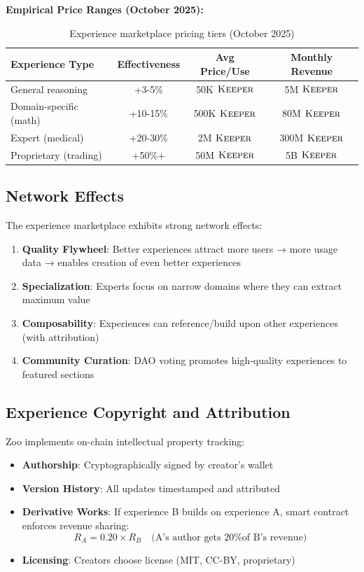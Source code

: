 \textbf{Empirical Price Ranges (October 2025):}

\begin{table}[h]
\centering
\begin{tabular}{lccc}
\toprule
\textbf{Experience Type} & \textbf{Effectiveness} & \textbf{Avg Price/Use} & \textbf{Monthly Revenue} \\
\midrule
General reasoning & +3-5\% & 50K $\textsc{Keeper}$ & 5M $\textsc{Keeper}$ \\
Domain-specific (math) & +10-15\% & 500K $\textsc{Keeper}$ & 80M $\textsc{Keeper}$ \\
Expert (medical) & +20-30\% & 2M $\textsc{Keeper}$ & 300M $\textsc{Keeper}$ \\
Proprietary (trading) & +50\%+ & 50M $\textsc{Keeper}$ & 5B $\textsc{Keeper}$ \\
\bottomrule
\end{tabular}
\caption{Experience marketplace pricing tiers (October 2025)}
\label{tab:experience_pricing}
\end{table}

\subsection{Network Effects}

The experience marketplace exhibits strong network effects:

\begin{enumerate}
\item \textbf{Quality Flywheel}: Better experiences attract more users → more usage data → enables creation of even better experiences
\item \textbf{Specialization}: Experts focus on narrow domains where they can extract maximum value
\item \textbf{Composability}: Experiences can reference/build upon other experiences (with attribution)
\item \textbf{Community Curation}: DAO voting promotes high-quality experiences to featured sections
\end{enumerate}

\subsection{Experience Copyright and Attribution}

Zoo implements on-chain intellectual property tracking:

\begin{itemize}
\item \textbf{Authorship}: Cryptographically signed by creator's wallet
\item \textbf{Version History}: All updates timestamped and attributed
\item \textbf{Derivative Works}: If experience B builds on experience A, smart contract enforces revenue sharing:
    \begin{equation}
    R_A = 0.20 \times R_B \quad \text{(A's author gets 20\% of B's revenue)}
    \end{equation}
\item \textbf{Licensing}: Creators choose license (MIT, CC-BY, proprietary)
\end{itemize}

